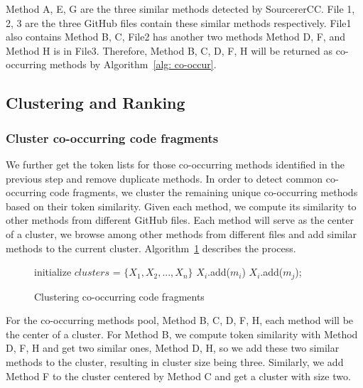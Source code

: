 {\ttt Method A, E, G} are the three similar methods detected by SourcererCC. {\ttt File 1, 2, 3} are the three GitHub files contain these similar methods respectively. 
{\ttt File1} also contains {\ttt Method B, C}, {\ttt File2} has another two methods {\ttt Method D, F}, and {\ttt Method H} is in {\ttt File3}. Therefore, {\ttt Method B, C, D, F, H} will be returned as co-occurring methods by Algorithm~\ref{alg: co-occur}.

\subsection{Clustering and Ranking}
\subsubsection{Cluster co-occurring code fragments}
We further get the token lists for those co-occurring methods identified in the previous step and remove duplicate methods. In order to detect common co-occurring code fragments, we cluster the remaining unique co-occurring methods
based on their token similarity. Given each method, we compute its similarity to other methods from different GitHub files. Each method will serve as the center of a cluster, we browse among other methods from different files and add similar methods to the current cluster. Algorithm~\ref{alg: clustering} describes the process.

\begin{figure}[h]
	\removelatexerror
	\begin{algorithm}[H]
		\label{alg: clustering}
		\caption{Clustering co-occurring code fragments}
		initialize $clusters$ = $\{X_1, X_2,..., X_n\}$\;
		{
			$X_i$.add($m_i$) \;
			{
				{
					{
						$X_i$.add($m_j$);
					}
				}
			} 
		}
	\end{algorithm}
\end{figure}

For the co-occurring methods pool, {\ttt Method B, C, D, F, H}, each method will be the center of a cluster. For {\ttt Method B}, we compute token similarity with {\ttt Method D, F, H} and get two similar ones, {\ttt Method D, H}, so we add these two similar methods to the cluster, resulting in cluster size being three. Similarly, we add {\ttt Method F} to the cluster centered by {\ttt Method C} and get a cluster with size two.

